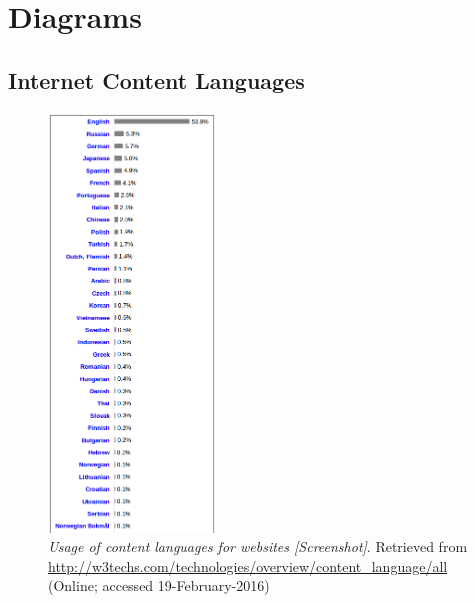 \chapter{Diagrams}

\section{Internet Content Languages}

\begin{figure}[H]
	\centering
	\includegraphics[height=30em]{diagrams/w3techsInternetContentLang.png}
	\caption[a figure]{\textit{Usage of content languages for websites [Screenshot]}. Retrieved from \url{http://w3techs.com/technologies/overview/content_language/all} (Online; accessed 19-February-2016)}
	\label{fig:w3techLang}
\end{figure}

